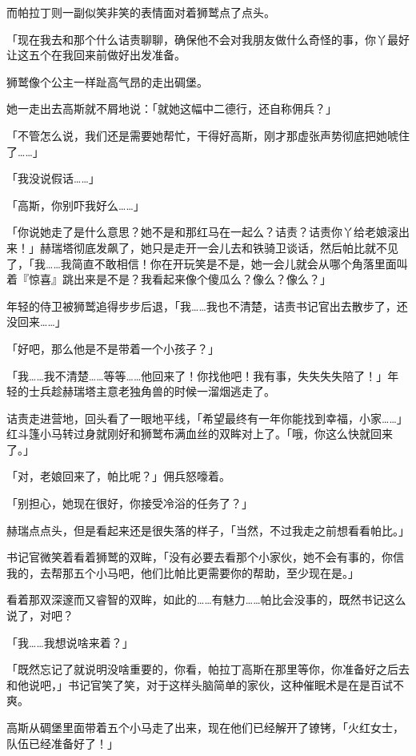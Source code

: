 而帕拉丁则一副似笑非笑的表情面对着狮鹫点了点头。

「现在我去和那个什么诘责聊聊，确保他不会对我朋友做什么奇怪的事，你丫最好让这五个在我回来前做好出发准备。

狮鹫像个公主一样趾高气昂的走出碉堡。

她一走出去高斯就不屑地说：「就她这幅中二德行，还自称佣兵？」

「不管怎么说，我们还是需要她帮忙，干得好高斯，刚才那虚张声势彻底把她唬住了……」

「我没说假话……」

「高斯，你别吓我好么……」

\horizonline


「你说她走了是什么意思？她不是和那红马在一起么？诘责？诘责你丫给老娘滚出来！」赫瑞塔彻底发飙了，她只是走开一会儿去和铁骑卫谈话，然后帕比就不见了，「我……我简直不敢相信！你在开玩笑是不是，她一会儿就会从哪个角落里面叫着『惊喜』跳出来是不是？我看起来像个傻瓜么？像么？像么？」

年轻的侍卫被狮鹫追得步步后退，「我……我也不清楚，诘责书记官出去散步了，还没回来……」

「好吧，那么他是不是带着一个小孩子？」

「我……我不清楚……等等……他回来了！你找他吧！我有事，失失失失陪了！」年轻的士兵趁赫瑞塔主意老独角兽的时候一溜烟逃走了。

诘责走进营地，回头看了一眼地平线，「希望最终有一年你能找到幸福，小家……」红斗篷小马转过身就刚好和狮鹫布满血丝的双眸对上了。「哦，你这么快就回来了。」

「对，老娘回来了，帕比呢？」佣兵怒嚎着。

「别担心，她现在很好，你接受冷浴的任务了？」

赫瑞点点头，但是看起来还是很失落的样子，「当然，不过我走之前想看看帕比。」

书记官微笑着看着狮鹫的双眸，「没有必要去看那个小家伙，她不会有事的，你信我的，去帮那五个小马吧，他们比帕比更需要你的帮助，至少现在是。」

看着那双深邃而又睿智的双眸，如此的……有魅力……帕比会没事的，既然书记这么说了，对吧？

「我……我想说啥来着？」

「既然忘记了就说明没啥重要的，你看，帕拉丁高斯在那里等你，你准备好之后去和他说吧，」书记官笑了笑，对于这样头脑简单的家伙，这种催眠术是在是百试不爽。

高斯从碉堡里面带着五个小马走了出来，现在他们已经解开了镣铐，「火红女士，队伍已经准备好了！」

